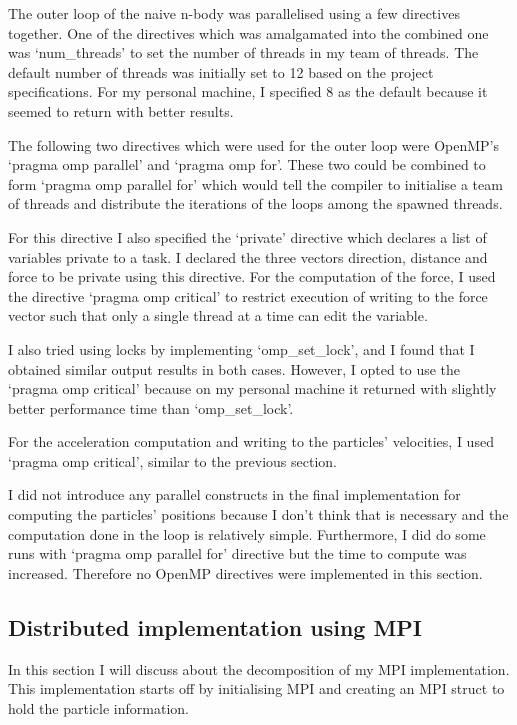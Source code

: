 \documentclass[12pt]{IEEEtran}
\begin{document}
The outer loop of the naive n-body was parallelised using a few directives together. One of the directives which was amalgamated into the combined one was `num\_threads' to set the number of threads in my team of threads. The default number of threads was initially set to 12 based on the project specifications. For my personal machine, I specified 8 as the default because it seemed to return with better results.
\medskip

The following two directives which were used for the outer loop were OpenMP's `pragma omp parallel' and `pragma omp for'. These two could be combined to form `pragma omp parallel for' which would tell the compiler to initialise a team of threads and distribute the iterations of the loops among the spawned threads.
\medskip

For this directive I also specified the `private' directive which declares a list of variables private to a task. I declared the three vectors direction, distance and force to be private using this directive. For the computation of the force, I used the directive `pragma omp critical' to restrict execution of writing to the force vector such that only a single thread at a time  can edit the variable. 
\medskip

I also tried using locks by implementing `omp\_set\_lock', and I found that I obtained similar output results in both cases. However, I opted to use the `pragma omp critical' because on my personal machine it returned with slightly better performance time than `omp\_set\_lock'.
\medskip

For the acceleration computation and writing to the particles' velocities, I used `pragma omp critical', similar to the previous section. 
\medskip

I did not introduce any parallel constructs in the final implementation for computing the particles' positions because I don't think that is necessary and the computation done in the loop is relatively simple. Furthermore, I did do some runs with `pragma omp parallel for' directive but the time to compute was increased. Therefore no OpenMP directives were implemented in this section.

\subsection{Distributed implementation using MPI}
In this section I will discuss about the decomposition of my MPI implementation. This implementation starts off by initialising MPI and creating an MPI struct to hold the particle information. 
\medskip
\end{document}
